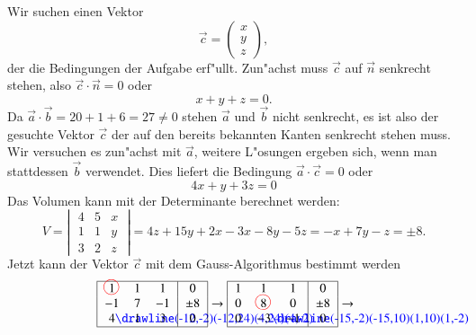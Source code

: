 \begin{beispiel}
{\parindent 0pt Wir suchen einen Vektor}
\[
\vec c=\begin{pmatrix}x\\y\\z\end{pmatrix},
\]
der die Bedingungen der Aufgabe erf"ullt.
Zun"achst muss $\vec c$ auf $\vec n$ senkrecht stehen,
also $\vec c\cdot\vec n=0$ oder
\[
x+y+z=0.
\]
Da $\vec a\cdot\vec b=20+1+6=27\ne 0$ stehen $\vec a$ und $\vec b$
nicht senkrecht, es ist also der gesuchte Vektor $\vec c$ der auf den bereits
bekannten Kanten senkrecht stehen muss.
Wir versuchen es zun"achst
mit $\vec a$, weitere L"osungen ergeben sich, wenn man stattdessen $\vec b$
verwendet.
Dies liefert die Bedingung $\vec a\cdot\vec c=0$ oder
\[
4x+y+3z=0
\]
Das Volumen kann mit der Determinante berechnet werden:
\[
V=\left|\;
\begin{matrix}
4&5&x\\
1&1&y\\
3&2&z
\end{matrix}
\;\right|=
4z+15y+2x-3x-8y-5z=-x+7y-z=\pm8.
\]
Jetzt kann der Vektor $\vec c$ mit dem Gauss-Algorithmus bestimmt werden
\begin{align*}
\begin{tabular}{|>{$}c<{$}>{$}c<{$}>{$}c<{$}|>{$}c<{$}|}
\hline
1%
\begin{picture}(0,0)
\color{red}\put(-3,4){\circle{12}}
\end{picture}%
&1&1&0\\
-1&7&-1&\pm8\\
4%
\begin{picture}(0,0)%
\color{blue}\drawline(-12,-2)(-12,24)(4,24)(4,-2)
\end{picture}%
&1&3&0\\
\hline
\end{tabular}
&
\rightarrow
\begin{tabular}{|>{$}c<{$}>{$}c<{$}>{$}c<{$}|>{$}c<{$}|}
\hline
1&1&1&0\\
0&8%
\begin{picture}(0,0)
\color{red}\put(-3,4){\circle{12}}
\end{picture}%
&0&\pm8\\
0&-3%
\begin{picture}(0,0)%
\color{blue}\drawline(-15,-2)(-15,10)(1,10)(1,-2)
\end{picture}%
&-1&0\\
\hline
\end{tabular}
\rightarrow
\begin{tabular}{|>{$}c<{$}>{$}c<{$}>{$}c<{$}|>{$}c<{$}|}

\end{tabular}
\end{align*}
\end{beispiel}
